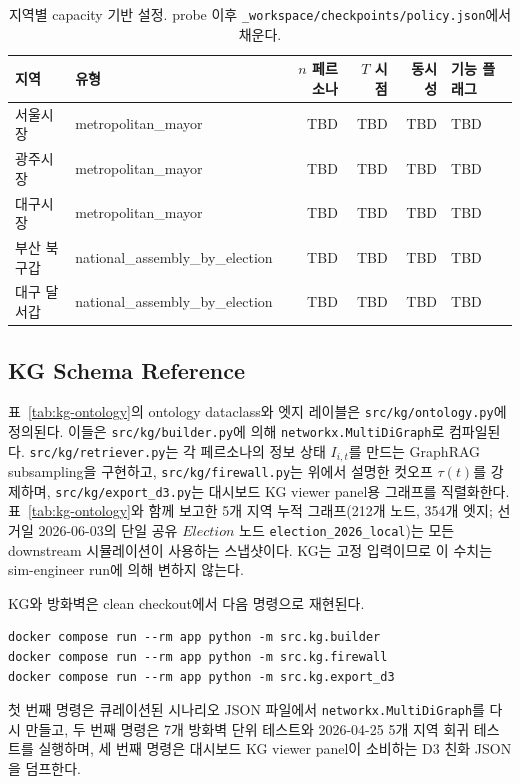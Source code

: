 \documentclass[11pt]{article}
\begin{document}
\begin{table}[h]
\centering
\caption{지역별 capacity 기반 설정. probe 이후 \texttt{\_workspace/checkpoints/policy.json}에서 채운다.}
\label{tab:capacity}
\small
\begin{tabular}{llrrrl}
\toprule
지역 & 유형 & $n$ 페르소나 & $T$ 시점 & 동시성 & 기능 플래그 \\
\midrule
서울시장 & metropolitan\_mayor & TBD & TBD & TBD & TBD \\
광주시장 & metropolitan\_mayor & TBD & TBD & TBD & TBD \\
대구시장 & metropolitan\_mayor & TBD & TBD & TBD & TBD \\
부산 북구갑 & national\_assembly\_by\_election & TBD & TBD & TBD & TBD \\
대구 달서갑 & national\_assembly\_by\_election & TBD & TBD & TBD & TBD \\
\bottomrule
\end{tabular}
\end{table}

\subsection{KG Schema Reference}
\label{app:kg-schema}

표~\ref{tab:kg-ontology}의 ontology dataclass와 엣지 레이블은 \texttt{src/kg/ontology.py}에 정의된다. 이들은 \texttt{src/kg/builder.py}에 의해 \texttt{networkx.MultiDiGraph}로 컴파일된다. \texttt{src/kg/retriever.py}는 각 페르소나의 정보 상태 $I_{i,t}$를 만드는 GraphRAG subsampling을 구현하고, \texttt{src/kg/firewall.py}는 위에서 설명한 컷오프 $\tau(t)$를 강제하며, \texttt{src/kg/export\_d3.py}는 대시보드 KG viewer panel용 그래프를 직렬화한다. 표~\ref{tab:kg-ontology}와 함께 보고한 5개 지역 누적 그래프(212개 노드, 354개 엣지; 선거일 2026-06-03의 단일 공유 $Election$ 노드 \texttt{election\_2026\_local})는 모든 downstream 시뮬레이션이 사용하는 스냅샷이다. KG는 고정 입력이므로 이 수치는 sim-engineer run에 의해 변하지 않는다.

KG와 방화벽은 clean checkout에서 다음 명령으로 재현된다.
\begin{verbatim}
docker compose run --rm app python -m src.kg.builder
docker compose run --rm app python -m src.kg.firewall
docker compose run --rm app python -m src.kg.export_d3
\end{verbatim}
첫 번째 명령은 큐레이션된 시나리오 JSON 파일에서 \texttt{networkx.MultiDiGraph}를 다시 만들고, 두 번째 명령은 7개 방화벽 단위 테스트와 2026-04-25 5개 지역 회귀 테스트를 실행하며, 세 번째 명령은 대시보드 KG viewer panel이 소비하는 D3 친화 JSON을 덤프한다.
\end{document}
